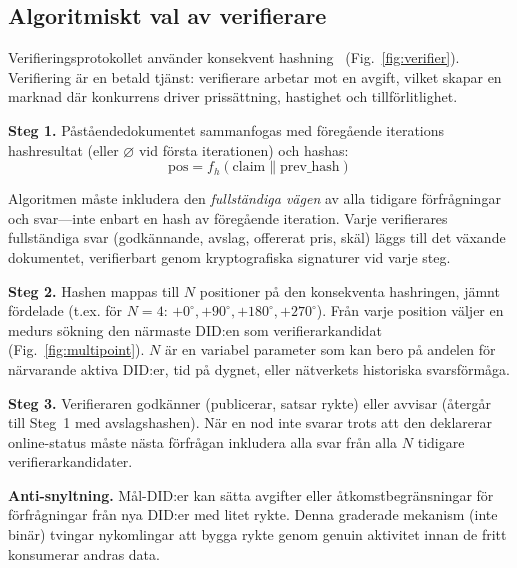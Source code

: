 \documentclass[11pt,a4paper,twocolumn]{article}
\begin{document}
\subsection{Algoritmiskt val av verifierare}

Verifieringsprotokollet använder konsekvent hashning~\cite{karger1997} (Fig.~\ref{fig:verifier}). Verifiering är en betald tjänst: verifierare arbetar mot en avgift, vilket skapar en marknad där konkurrens driver prissättning, hastighet och tillförlitlighet.

\textbf{Steg 1.} Påståendedokumentet sammanfogas med föregående iterations hashresultat (eller $\varnothing$ vid första iterationen) och hashas:
\begin{equation}
\text{pos} = f_h(\text{claim} \| \text{prev\_hash})
\label{eq:hash}
\end{equation}

Algoritmen måste inkludera den \emph{fullständiga vägen} av alla tidigare förfrågningar och svar---inte enbart en hash av föregående iteration. Varje verifierares fullständiga svar (godkännande, avslag, offererat pris, skäl) läggs till det växande dokumentet, verifierbart genom kryptografiska signaturer vid varje steg.

\textbf{Steg 2.} Hashen mappas till $N$ positioner på den konsekventa hashringen, jämnt fördelade (t.ex. för $N=4$: $+0^{\circ}, +90^{\circ}, +180^{\circ}, +270^{\circ}$). Från varje position väljer en medurs sökning den närmaste DID:en som verifierarkandidat (Fig.~\ref{fig:multipoint}). $N$ är en variabel parameter som kan bero på andelen för närvarande aktiva DID:er, tid på dygnet, eller nätverkets historiska svarsförmåga.

\textbf{Steg 3.} Verifieraren godkänner (publicerar, satsar rykte) eller avvisar (återgår till Steg~1 med avslagshashen). När en nod inte svarar trots att den deklarerar online-status måste nästa förfrågan inkludera alla svar från alla $N$ tidigare verifierarkandidater.

\textbf{Anti-snyltning.} Mål-DID:er kan sätta avgifter eller åtkomstbegränsningar för förfrågningar från nya DID:er med litet rykte. Denna graderade mekanism (inte binär) tvingar nykomlingar att bygga rykte genom genuin aktivitet innan de fritt konsumerar andras data.
\end{document}
